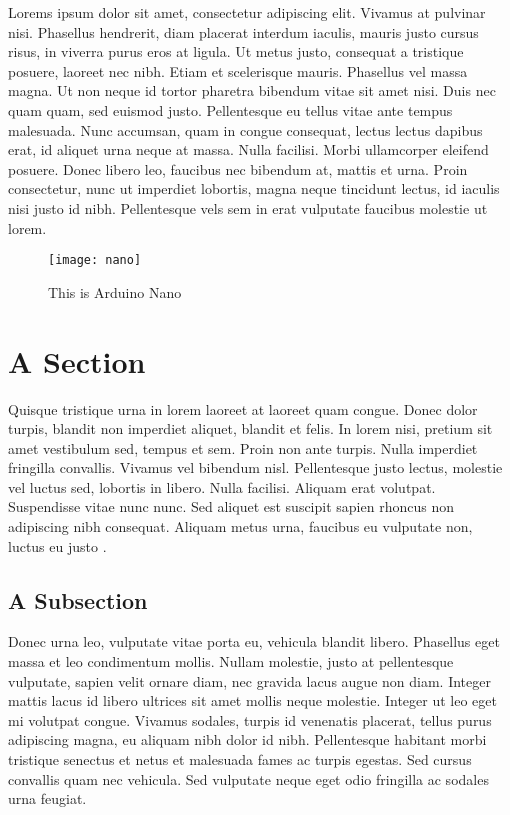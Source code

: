 Lorems ipsum dolor sit amet, consectetur adipiscing elit. Vivamus at pulvinar nisi. Phasellus hendrerit, diam placerat interdum iaculis, mauris justo cursus risus, in viverra purus eros at ligula. Ut metus justo, consequat a tristique posuere, laoreet nec nibh. Etiam et scelerisque mauris. Phasellus vel massa magna. Ut non neque id tortor pharetra bibendum vitae sit amet nisi. Duis nec quam quam, sed euismod justo. Pellentesque eu tellus vitae ante tempus malesuada. Nunc accumsan, quam in congue consequat, lectus lectus dapibus erat, id aliquet urna neque at massa. Nulla facilisi. Morbi ullamcorper eleifend posuere. Donec libero leo, faucibus nec bibendum at, mattis et urna. Proin consectetur, nunc ut imperdiet lobortis, magna neque tincidunt lectus, id iaculis nisi justo id nibh. Pellentesque vels sem in erat vulputate faucibus molestie ut lorem\cite{graves2013speech}.

\begin{figure}
    \centering
    \texttt{[image: nano]}
    \caption{This is Arduino Nano}
    \label{fig:nano}
\end{figure}

\section{A Section}

Quisque tristique urna in lorem laoreet at laoreet quam congue. Donec dolor turpis, blandit non imperdiet aliquet, blandit et felis. In lorem nisi, pretium sit amet vestibulum sed, tempus et sem. Proin non ante turpis. Nulla imperdiet fringilla convallis. Vivamus vel bibendum nisl. Pellentesque justo lectus, molestie vel luctus sed, lobortis in libero. Nulla facilisi. Aliquam erat volutpat. Suspendisse vitae nunc nunc. Sed aliquet est suscipit sapien rhoncus non adipiscing nibh consequat. Aliquam metus urna, faucibus eu vulputate non, luctus eu justo \cite{wang2002hot}.

\subsection{A Subsection}

Donec urna leo, vulputate vitae porta eu, vehicula blandit libero. Phasellus eget massa et leo condimentum mollis. Nullam molestie, justo at pellentesque vulputate, sapien velit ornare diam, nec gravida lacus augue non diam. Integer mattis lacus id libero ultrices sit amet mollis neque molestie. Integer ut leo eget mi volutpat congue. Vivamus sodales, turpis id venenatis placerat, tellus purus adipiscing magna, eu aliquam nibh dolor id nibh. Pellentesque habitant morbi tristique senectus et netus et malesuada fames ac turpis egestas. Sed cursus convallis quam nec vehicula. Sed vulputate neque eget odio fringilla ac sodales urna feugiat.

